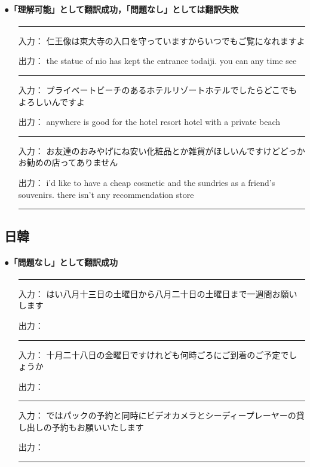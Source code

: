 \vspace{5mm}
\paragraph{●「理解可能」として翻訳成功，「問題なし」としては翻訳失敗}

\begin{itemize}
\item[]\rule{132mm}{0.2mm}
\item[入力：]仁王像は東大寺の入口を守っていますからいつでもご覧になれますよ    
\item[出力：]the statue of nio has kept the entrance todaiji. you can any time see 
\item[]\rule{132mm}{0.2mm}
\item[入力：]プライベートビーチのあるホテルリゾートホテルでしたらどこでもよろしいんですよ    
\item[出力：]anywhere is good for the hotel resort hotel with a private beach 
\item[]\rule{132mm}{0.2mm}
\item[入力：]お友達のおみやげにね安い化粧品とか雑貨がほしいんですけどどっかお勧めの店ってありません    
\item[出力：]i'd like to have a cheap cosmetic and the sundries as a friend's souvenirs. there isn't any recommendation store  
\item[]\rule{132mm}{0.2mm}
\end{itemize}

\newpage
\subsection{日韓}
\paragraph{●「問題なし」として翻訳成功}

\unitlength=1mm
\begin{itemize}
\item[]\rule{132mm}{0.2mm}
\item[入力：]はい八月十三日の土曜日から八月二十日の土曜日まで一週間お願いします
\item[出力：]


\item[]\rule{132mm}{0.2mm}
\item[入力：]十月二十八日の金曜日ですけれども何時ごろにご到着のご予定でしょうか 
\item[出力：]
\item[]\rule{132mm}{0.2mm}
\item[入力：]ではパックの予約と同時にビデオカメラとシーディープレーヤーの貸し出しの予約もお願いいたします 
\item[出力：]
\item[]\rule{132mm}{0.2mm}
\end{itemize}


